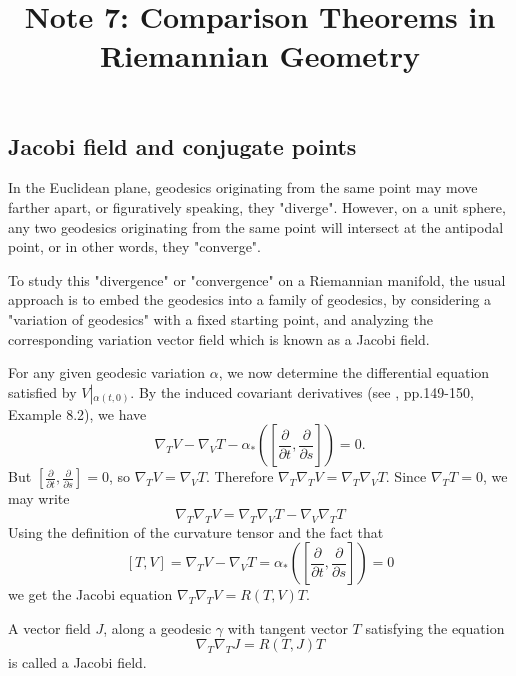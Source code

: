 \documentclass{ctexart}
\title{Note 7: Comparison Theorems in Riemannian Geometry}
\date{} %
\begin{document}
\maketitle

\subsection*{Jacobi field and conjugate points}

In the Euclidean plane, geodesics originating from the same point may move farther apart, or figuratively speaking, they "diverge". However, on a unit sphere, 
any two geodesics originating from the same point will intersect at the antipodal point, or in other words, they "converge".

To study this "divergence" or "convergence" on a Riemannian manifold, the usual approach is to embed the geodesics into a family of geodesics, 
by considering a "variation of geodesics" with a fixed starting point, and analyzing the corresponding variation vector field which is known as a Jacobi field. 

For any given geodesic variation $\alpha$, we now determine the differential equation satisfied by $V \left|_{\alpha(t, 0)}\right.$. 
By the induced covariant derivatives (see \cite{ChenWeiHuan2002}, pp.149-150, Example 8.2), we have
$$
\nabla_T V-\nabla_V T-\alpha_*\left(\left[\frac{\partial}{\partial t}, \frac{\partial}{\partial s}\right]\right)=0 .
$$
But $\left[\frac{\partial}{\partial t}, \frac{\partial}{\partial s}\right]=0$, so $\nabla_T V=\nabla_V T$. Therefore $\nabla_T \nabla_T V=\nabla_T \nabla_V T$. Since $\nabla_T T=0$, we may write
$$
\nabla_T \nabla_T V=\nabla_T \nabla_V T-\nabla_V \nabla_T T
$$
Using the definition of the curvature tensor and the fact that
$$
[T, V]=\nabla_T V-\nabla_V T=\alpha_*\left(\left[\frac{\partial}{\partial t}, \frac{\partial}{\partial s}\right]\right)=0
$$
we get the Jacobi equation $\nabla_T \nabla_T V=R(T, V) T.$
\begin{definition}
  A vector field $J$, along a geodesic $\gamma$ with tangent vector $T$ satisfying the equation 
  $$
  \nabla_T \nabla_T J=R(T, J) T
  $$
  is called a Jacobi field. 
\end{definition}
\end{document}
